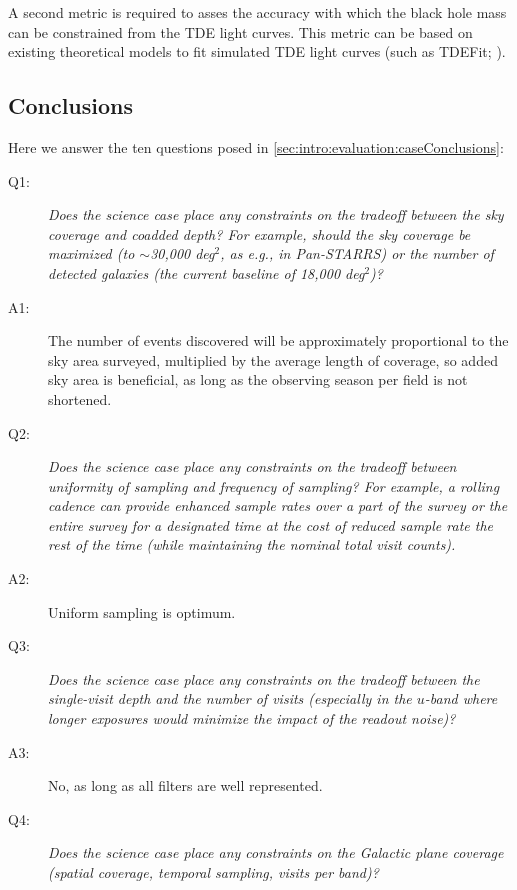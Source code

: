 A second metric is required to asses the accuracy with which the black
hole mass can be constrained from the TDE light curves. This metric can
be based on existing theoretical models to fit simulated TDE light
curves (such as TDEFit; \citealt{Guillochon2014}).

%
 \subsection{Conclusions}

 Here we answer the ten questions posed in
 \autoref{sec:intro:evaluation:caseConclusions}:

 \begin{description}

 \item[Q1:] {\it Does the science case place any constraints on the
 tradeoff between the sky coverage and coadded depth? For example, should
 the sky coverage be maximized (to $\sim$30,000 deg$^2$, as e.g., in
 Pan-STARRS) or the number of detected galaxies (the current baseline 
 of 18,000 deg$^2$)?}

 \item[A1:] The number of events discovered will be approximately proportional to the sky area surveyed, multiplied by the 
 average length of coverage, so added sky area is beneficial, as long as the observing season per field is not shortened.

 \item[Q2:] {\it Does the science case place any constraints on the
 tradeoff between uniformity of sampling and frequency of  sampling? For
 example, a rolling cadence can provide enhanced sample rates over a part
 of the survey or the entire survey for a designated time at the cost of
 reduced sample rate the rest of the time (while maintaining the nominal
 total visit counts).}

 \item[A2:] Uniform sampling is optimum.

 \item[Q3:] {\it Does the science case place any constraints on the
 tradeoff between the single-visit depth and the number of visits
 (especially in the $u$-band where longer exposures would minimize the
 impact of the readout noise)?}

 \item[A3:] No, as long as all filters are well represented.

 \item[Q4:] {\it Does the science case place any constraints on the
 Galactic plane coverage (spatial coverage, temporal sampling, visits per
 band)?}


\end{description}
